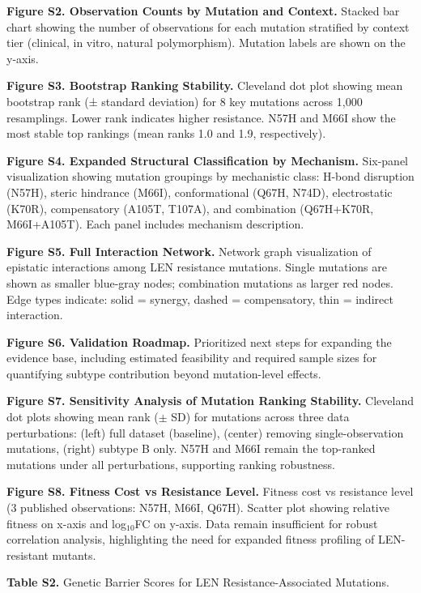 \documentclass[12pt,a4paper]{article}
\begin{document}
\bigskip
\noindent\textbf{Figure S2. Observation Counts by Mutation and Context.}
Stacked bar chart showing the number of observations for each mutation stratified by context tier (clinical, in vitro, natural polymorphism). Mutation labels are shown on the y-axis.

\bigskip
\noindent\textbf{Figure S3. Bootstrap Ranking Stability.}
Cleveland dot plot showing mean bootstrap rank (± standard deviation) for 8 key mutations across 1,000 resamplings. Lower rank indicates higher resistance. N57H and M66I show the most stable top rankings (mean ranks 1.0 and 1.9, respectively).

\bigskip
\noindent\textbf{Figure S4. Expanded Structural Classification by Mechanism.}
Six-panel visualization showing mutation groupings by mechanistic class: H-bond disruption (N57H), steric hindrance (M66I), conformational (Q67H, N74D), electrostatic (K70R), compensatory (A105T, T107A), and combination (Q67H+K70R, M66I+A105T). Each panel includes mechanism description.

\bigskip
\noindent\textbf{Figure S5. Full Interaction Network.}
Network graph visualization of epistatic interactions among LEN resistance mutations. Single mutations are shown as smaller blue-gray nodes; combination mutations as larger red nodes. Edge types indicate: solid = synergy, dashed = compensatory, thin = indirect interaction.

\bigskip
\noindent\textbf{Figure S6. Validation Roadmap.}
Prioritized next steps for expanding the evidence base, including estimated feasibility and required sample sizes for quantifying subtype contribution beyond mutation-level effects.

\bigskip
\noindent\textbf{Figure S7. Sensitivity Analysis of Mutation Ranking Stability.}
Cleveland dot plots showing mean rank ($\pm$ SD) for mutations across three data perturbations: (left) full dataset (baseline), (center) removing single-observation mutations, (right) subtype B only. N57H and M66I remain the top-ranked mutations under all perturbations, supporting ranking robustness.

\bigskip
\noindent\textbf{Figure S8. Fitness Cost vs Resistance Level.}
Fitness cost vs resistance level (3 published observations: N57H, M66I, Q67H). Scatter plot showing relative fitness on x-axis and log$_{10}$FC on y-axis. Data remain insufficient for robust correlation analysis, highlighting the need for expanded fitness profiling of LEN-resistant mutants.

\bigskip
\noindent\textbf{Table S2.} Genetic Barrier Scores for LEN Resistance-Associated Mutations.
\bigskip
\end{document}
